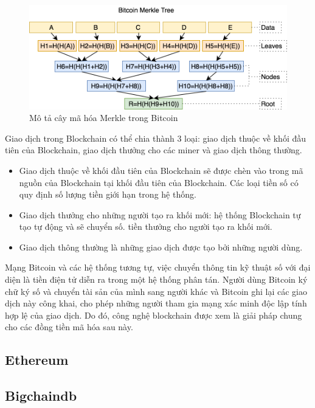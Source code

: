 \begin{figure}[htbp]
\centering
\includegraphics[width=.9\linewidth]{img/merkle.png}
\caption{Mô tả cây mã hóa Merkle trong Bitcoin}
\label{fig:merkle}
\end{figure}

Giao dịch trong Blockchain có thể chia thành 3 loại: giao dịch  thuộc về khối đầu tiên của Blockchain, giao dịch thưởng cho các miner và giao dịch thông thường.

\begin{itemize}
\item Giao dịch thuộc về khối đầu tiên của Blockchain sẽ được chèn vào trong mã nguồn của Blockchain tại khối đầu tiên của Blockchain. Các loại tiền số có quy định số lượng tiền giới hạn trong hệ thống.
\item Giao dịch thưởng cho những người tạo ra khối mới: hệ thống Blockchain tự tạo tự động và sẽ chuyển số. tiền thưởng cho người tạo ra khối mới.
\item Giao dịch thông thường là những giao dịch được tạo bởi những người dùng. 
\end{itemize}

Mạng Bitcoin và các hệ thống tương tự, việc chuyển thông tin kỹ thuật số với đại diện là tiền điện tử diễn ra trong một hệ thống phân tán.
Người dùng Bitcoin ký chữ ký số và chuyển tài sản của mình sang người khác và Bitcoin ghi lại các giao dịch này công khai, cho phép những người tham gia mạng xác minh độc lập tính hợp lệ của giao dịch. 
Do đó, công nghệ blockchain được xem là giải pháp chung cho các đồng tiền mã hóa sau này.

\subsection{Ethereum}

\subsection{Bigchaindb}

